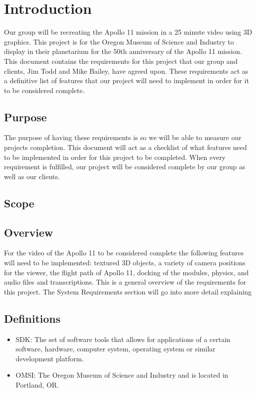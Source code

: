 \documentclass[onecolumn, draftclsnofoot,10pt, compsoc]{IEEEtran}
\begin{document}
\section{Introduction}
Our group will be recreating the Apollo 11 mission in a 25 minute video using 3D graphics. This project is for the Oregon Museum of Science and Industry to display in their planetarium for the 50th anniversary of the Apollo 11 mission. This document contains the requirements for this project that our group and clients, Jim Todd and Mike Bailey, have agreed upon. These requirements act as a definitive list of features that our project will need to implement in order for it to be considered complete. 
    \subsection{Purpose}
    The purpose of having these requirements is so we will be able to measure our projects completion. This document will act as a checklist of what features need to be implemented in order for this project to be completed. When every requirement is fulfilled, our project will be considered complete by our group as well as our clients.
    \subsection{Scope}
    \subsection{Overview}
    For the video of the Apollo 11 to be considered complete the following features will need to be implemented: textured 3D objects, a variety of camera positions for the viewer, the flight path of Apollo 11, docking of the modules, physics, and audio files and transcriptions. This is a general overview of the requirements for this project. The System Requirements section will go into more detail explaining  
    \subsection{Definitions}
    \begin{itemize}
        \item SDK: The set of software tools that allows for applications of a certain software, hardware, computer system, operating system or similar development platform.
        \item OMSI: The Oregon Museum of Science and Industry and is located in Portland, OR.
    \end{itemize}
\end{document}
